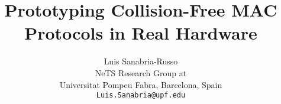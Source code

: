 \documentclass[conference]{IEEEtran}
\begin{document}
 \title{Prototyping Collision-Free MAC Protocols in Real Hardware}



\author{Luis Sanabria-Russo \\
		NeTS Research Group at\\
		Universitat Pompeu Fabra, Barcelona, Spain\\
		\texttt{Luis.Sanabria@upf.edu}}



\maketitle
\end{document}
